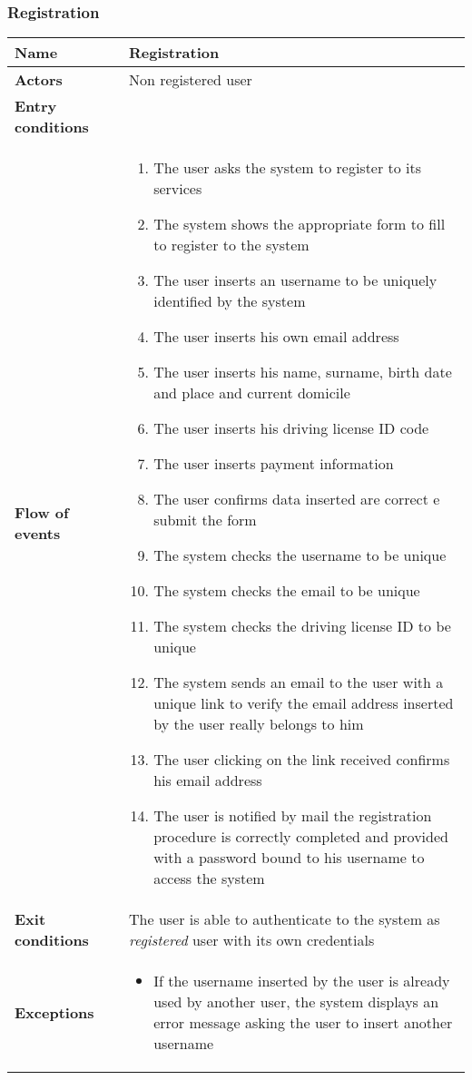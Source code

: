 \subsubsection{Registration}
\begin{longtable}{p{0.25\linewidth}p{0.75\linewidth}}
\toprule
\textbf{Name} & \textbf{Registration} \\
\midrule
\textbf{Actors} & Non registered user \\
\midrule
\textbf{Entry conditions} & \\
\midrule
\textbf{Flow of events} & 
\begin{enumerate}
	\item The user asks the system to register to its services
	\item The system shows the appropriate form to fill to register to the system
	\item The user inserts an username to be uniquely identified by the system
	\item The user inserts his own email address
	\item The user inserts his name, surname, birth date and place and current domicile
	\item The user inserts his driving license ID code
	\item The user inserts payment information
	\item The user confirms data inserted are correct e submit the form
	\item The system checks the username to be unique
	\item The system checks the email to be unique
	\item The system checks the driving license ID to be unique
	\item The system sends an email to the user with a unique link to verify the email address inserted by the user really belongs to him
	\item The user clicking on the link received confirms his email address
	\item The user is notified by mail the registration procedure is correctly completed and
	provided with a password bound to his username to access the system
\end{enumerate} \\
\midrule
\textbf{Exit conditions} & The user is able to authenticate to the system as \emph{registered} user with its own credentials\\
\midrule
\textbf{Exceptions} & 
\begin{itemize}
	\item If the username inserted by the user is already used by another user, the system displays an error message asking the user to insert another username

\end{itemize}
\end{longtable}

